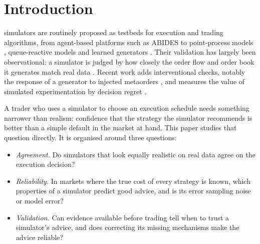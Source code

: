 \documentclass{ieeeaccess}
\begin{document}
\titlepgskip=-21pt

\maketitle

\section{Introduction}
\label{sec:introduction}
 simulators are routinely proposed as testbeds for execution and trading algorithms, from agent-based
platforms such as ABIDES \cite{byrd2019abides,amrouni2021abidesgym} to point-process models \cite{bacry2015hawkes},
queue-reactive models \cite{huang2015queue} and learned generators \cite{coletta2021towards,berti2025trades}. Their
validation has largely been observational: a simulator is judged by how closely the order flow and order book it
generates match real data \cite{vyetrenko2020getreal,nagy2025lobbench}. Recent work adds interventional checks, notably
the response of a generator to injected metaorders \cite{nigmatulin2026lobimpact}, and measures the value of simulated
experimentation by decision regret \cite{lu2026crashgym}.

A trader who uses a simulator to choose an execution schedule needs something narrower than realism: confidence that the
strategy the simulator recommends is better than a simple default in the market at hand. This paper studies that
question directly. It is organised around three questions:
\begin{itemize}
\item \emph{Agreement.} Do simulators that look equally realistic on real data agree on the execution decision?
\item \emph{Reliability.} In markets where the true cost of every strategy is known, which properties of a simulator
predict good advice, and is its error sampling noise or model error?
\item \emph{Validation.} Can evidence available before trading tell when to trust a simulator's advice, and does
correcting its missing mechanisms make the advice reliable?
\end{itemize}
\end{document}
